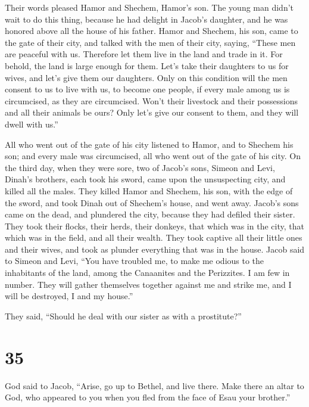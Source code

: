  Their words pleased Hamor and Shechem, Hamor's son.
 The young man didn't wait to do this thing, because he had
delight in Jacob's daughter, and he was honored above all the house of
his father.  Hamor and Shechem, his son, came to the gate
of their city, and talked with the men of their city, saying,
 ``These men are peaceful with us. Therefore let them live
in the land and trade in it. For behold, the land is large enough for
them. Let's take their daughters to us for wives, and let's give them
our daughters.  Only on this condition will the men consent
to us to live with us, to become one people, if every male among us is
circumcised, as they are circumcised.  Won't their
livestock and their possessions and all their animals be ours? Only
let's give our consent to them, and they will dwell with us.''

 All who went out of the gate of his city listened to
Hamor, and to Shechem his son; and every male was circumcised, all who
went out of the gate of his city.  On the third day, when
they were sore, two of Jacob's sons, Simeon and Levi, Dinah's brothers,
each took his sword, came upon the unsuspecting city, and killed all the
males.  They killed Hamor and Shechem, his son, with the
edge of the sword, and took Dinah out of Shechem's house, and went away.
 Jacob's sons came on the dead, and plundered the city,
because they had defiled their sister.  They took their
flocks, their herds, their donkeys, that which was in the city, that
which was in the field,  and all their wealth. They took
captive all their little ones and their wives, and took as plunder
everything that was in the house.  Jacob said to Simeon and
Levi, ``You have troubled me, to make me odious to the inhabitants of
the land, among the Canaanites and the Perizzites. I am few in number.
They will gather themselves together against me and strike me, and I
will be destroyed, I and my house.''

 They said, ``Should he deal with our sister as with a
prostitute?''

\hypertarget{section-34}{%
\section{35}\label{section-34}}

 God said to Jacob, ``Arise, go up to Bethel, and live
there. Make there an altar to God, who appeared to you when you fled
from the face of Esau your brother.''

